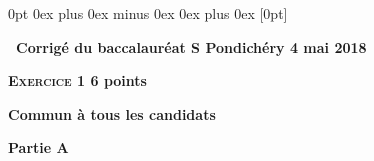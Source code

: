 \documentclass[11pt,a4paper,answers,fancyhdr]{exam}
\newcommand{\entetecor}[4]{%
                  
\rhead{#3}
\chead{\shadowbox{Corrigé du baccalauréat S  #1 du #2}}
\lfoot{Baccalauréat 2018}
\rfoot{A. Detant}
\setcounter{page}{1}
\cfoot{page \thepage ~sur~ \pageref{LastPage}}
\newgeometry{left=1.5cm, right=1.5cm , top=2cm , bottom=2.5cm}             
                  }
\begin{document}

\titlespacing*{\subsubsection}
{0pt}%
{0ex plus 0ex minus 0ex}%
{0ex plus 0ex}%
[0pt]%
\pagestyle{fancy}
\thispagestyle{empty}
\begin{center}{\Large\textbf{\decofourleft~Corrigé du baccalauréat S Pondichéry  4 mai 2018~\decofourright}}
\end{center}

\label{exercice 1}
\textbf{\textsc{Exercice 1} \hfill 6 points}
 
\textbf{Commun à tous les candidats}

\medskip

%
%
%
%
%
%
%
%
%

\textbf{Partie A}

\medskip


%
%
\end{document}
